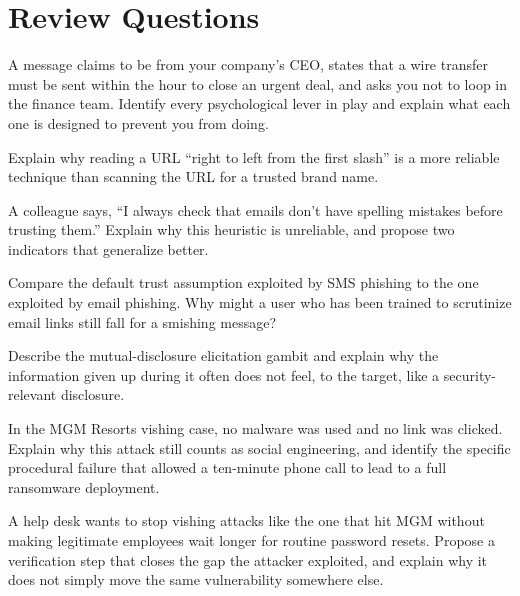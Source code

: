 \section*{Review Questions}
\begin{reviewquestions}
\item A message claims to be from your company's CEO, states that a wire transfer must be sent
within the hour to close an urgent deal, and asks you not to loop in the finance team. Identify
every psychological lever in play and explain what each one is designed to prevent you from
doing.
\item Explain why reading a URL ``right to left from the first slash'' is a more reliable
technique than scanning the URL for a trusted brand name.
\item A colleague says, ``I always check that emails don't have spelling mistakes before trusting
them.'' Explain why this heuristic is unreliable, and propose two indicators that generalize
better.
\item Compare the default trust assumption exploited by SMS phishing to the one exploited by
email phishing. Why might a user who has been trained to scrutinize email links still fall for a
smishing message?
\item Describe the mutual-disclosure elicitation gambit and explain why the information given up
during it often does not feel, to the target, like a security-relevant disclosure.
\item In the MGM Resorts vishing case, no malware was used and no link was clicked. Explain why
this attack still counts as social engineering, and identify the specific procedural failure that
allowed a ten-minute phone call to lead to a full ransomware deployment.
\item A help desk wants to stop vishing attacks like the one that hit MGM without making
legitimate employees wait longer for routine password resets. Propose a verification step that
closes the gap the attacker exploited, and explain why it does not simply move the same
vulnerability somewhere else.
\end{reviewquestions}

